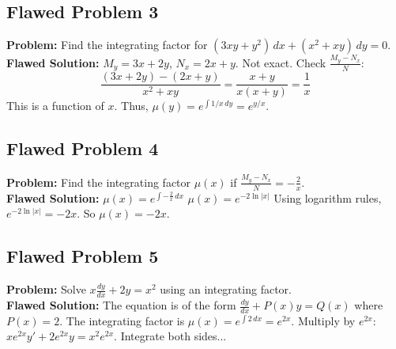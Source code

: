 \documentclass[11pt]{article}
\begin{document}
\vspace{2cm}

\subsection*{Flawed Problem 3}
\textbf{Problem:} Find the integrating factor for $(3xy + y^2) \, dx + (x^2 + xy) \, dy = 0$. \\
\textbf{Flawed Solution:}
$M_y = 3x + 2y$, $N_x = 2x + y$. Not exact.
Check $\frac{M_y - N_x}{N}$:
\[ \frac{(3x + 2y) - (2x + y)}{x^2 + xy} = \frac{x + y}{x(x + y)} = \frac{1}{x} \]
This is a function of $x$. Thus, $\mu(y) = e^{\int 1/x \, dy} = e^{y/x}$.

\vspace{2cm}

\subsection*{Flawed Problem 4}
\textbf{Problem:} Find the integrating factor $\mu(x)$ if $\frac{M_y - N_x}{N} = -\frac{2}{x}$. \\
\textbf{Flawed Solution:}
$\mu(x) = e^{\int -\frac{2}{x} \, dx}$
$\mu(x) = e^{-2\ln|x|}$
Using logarithm rules, $e^{-2\ln|x|} = -2x$.
So $\mu(x) = -2x$.

\vspace{2cm}

\subsection*{Flawed Problem 5}
\textbf{Problem:} Solve $x \frac{dy}{dx} + 2y = x^2$ using an integrating factor. \\
\textbf{Flawed Solution:}
The equation is of the form $\frac{dy}{dx} + P(x)y = Q(x)$ where $P(x) = 2$.
The integrating factor is $\mu(x) = e^{\int 2 \, dx} = e^{2x}$.
Multiply by $e^{2x}$:
$x e^{2x} y' + 2 e^{2x} y = x^2 e^{2x}$.
Integrate both sides...
\end{document}
